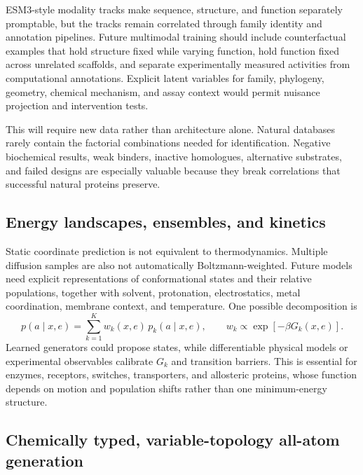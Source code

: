 \documentclass[10pt]{article}
\begin{document}
ESM3-style modality tracks make sequence, structure, and function separately promptable, but the
tracks remain correlated through family identity and annotation pipelines.  Future multimodal
training should include counterfactual examples that hold structure fixed while varying function,
hold function fixed across unrelated scaffolds, and separate experimentally measured activities
from computational annotations.  Explicit latent variables for family, phylogeny, geometry,
chemical mechanism, and assay context would permit nuisance projection and intervention tests.

This will require new data rather than architecture alone.  Natural databases rarely contain the
factorial combinations needed for identification.  Negative biochemical results, weak binders,
inactive homologues, alternative substrates, and failed designs are especially valuable because
they break correlations that successful natural proteins preserve.

\subsection{Energy landscapes, ensembles, and kinetics}

Static coordinate prediction is not equivalent to thermodynamics.  Multiple diffusion samples are
also not automatically Boltzmann-weighted.  Future models need explicit representations of
conformational states and their relative populations, together with solvent, protonation,
electrostatics, metal coordination, membrane context, and temperature.  One possible decomposition
is
\begin{equation}
p(a\mid x,e)
=\sum_{k=1}^{K}w_k(x,e)\,p_k(a\mid x,e),
\qquad
w_k\propto\exp[-\beta G_k(x,e)].
\label{eq:ensemble-mixture}
\end{equation}
Learned generators could propose states, while differentiable physical models or experimental
observables calibrate $G_k$ and transition barriers.  This is essential for enzymes, receptors,
switches, transporters, and allosteric proteins, whose function depends on motion and population
shifts rather than one minimum-energy structure.

\subsection{Chemically typed, variable-topology all-atom generation}
\end{document}
